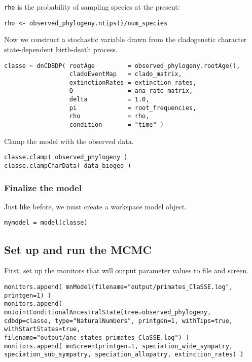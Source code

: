 \texttt{rho} is the probability of sampling species at the present:
{\tt \begin{snugshade*}
\begin{lstlisting}
rho <- observed_phylogeny.ntips()/num_species
\end{lstlisting}
\end{snugshade*}}

Now we construct a stochastic variable drawn from the cladogenetic 
character state-dependent birth-death process.
{\tt \begin{snugshade*}
\begin{lstlisting}
classe ~ dnCDBDP( rootAge         = observed_phylogeny.rootAge(),
                  cladoEventMap   = clado_matrix,
                  extinctionRates = extinction_rates,
                  Q               = ana_rate_matrix,
                  delta           = 1.0,
                  pi              = root_frequencies,
                  rho             = rho,
                  condition       = "time" )
\end{lstlisting}
\end{snugshade*}}

Clamp the model with the observed data.
{\tt \begin{snugshade*}
\begin{lstlisting}
classe.clamp( observed_phylogeny )
classe.clampCharData( data_biogeo )
\end{lstlisting}
\end{snugshade*}}

\subsubsection{Finalize the model}

Just like before, we must create a workspace model object.
{\tt \begin{snugshade*}
\begin{lstlisting}
mymodel = model(classe)
\end{lstlisting}
\end{snugshade*}}

\subsection{Set up and run the MCMC}

First, set up the monitors that will output parameter values to file and screen.
{\tt \begin{snugshade*}
\begin{lstlisting}
monitors.append( mnModel(filename="output/primates_ClaSSE.log", printgen=1) )
monitors.append( mnJointConditionalAncestralState(tree=observed_phylogeny, cdbdp=classe, type="NaturalNumbers", printgen=1, withTips=true, withStartStates=true, filename="output/anc_states_primates_ClaSSE.log") )
monitors.append( mnScreen(printgen=1, speciation_wide_sympatry, speciation_sub_sympatry, speciation_allopatry, extinction_rates) )
\end{lstlisting}
\end{snugshade*}}

